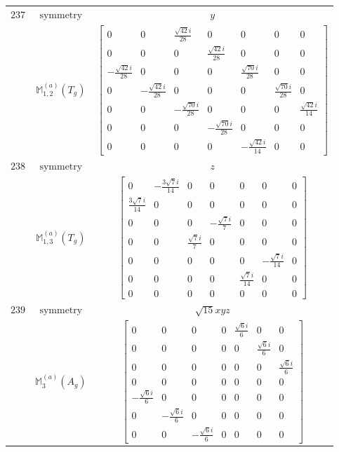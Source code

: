 \documentclass[fleqn,8pt,landscape]{jsarticle}
\begin{document}
\begin{longtable}{ccc}
$ 237 $ & $ \text{symmetry} $ & $ y $ \\
$  $ & $ \mathbb{M}_{1,2}^{(a)}(T_{g}) $ & $ \begin{bmatrix} 0 & 0 & \frac{\sqrt{42} i}{28} & 0 & 0 & 0 & 0 \\ 0 & 0 & 0 & \frac{\sqrt{42} i}{28} & 0 & 0 & 0 \\ - \frac{\sqrt{42} i}{28} & 0 & 0 & 0 & \frac{\sqrt{70} i}{28} & 0 & 0 \\ 0 & - \frac{\sqrt{42} i}{28} & 0 & 0 & 0 & \frac{\sqrt{70} i}{28} & 0 \\ 0 & 0 & - \frac{\sqrt{70} i}{28} & 0 & 0 & 0 & \frac{\sqrt{42} i}{14} \\ 0 & 0 & 0 & - \frac{\sqrt{70} i}{28} & 0 & 0 & 0 \\ 0 & 0 & 0 & 0 & - \frac{\sqrt{42} i}{14} & 0 & 0 \end{bmatrix} $ \\ \hline
$ 238 $ & $ \text{symmetry} $ & $ z $ \\
$  $ & $ \mathbb{M}_{1,3}^{(a)}(T_{g}) $ & $ \begin{bmatrix} 0 & - \frac{3 \sqrt{7} i}{14} & 0 & 0 & 0 & 0 & 0 \\ \frac{3 \sqrt{7} i}{14} & 0 & 0 & 0 & 0 & 0 & 0 \\ 0 & 0 & 0 & - \frac{\sqrt{7} i}{7} & 0 & 0 & 0 \\ 0 & 0 & \frac{\sqrt{7} i}{7} & 0 & 0 & 0 & 0 \\ 0 & 0 & 0 & 0 & 0 & - \frac{\sqrt{7} i}{14} & 0 \\ 0 & 0 & 0 & 0 & \frac{\sqrt{7} i}{14} & 0 & 0 \\ 0 & 0 & 0 & 0 & 0 & 0 & 0 \end{bmatrix} $ \\ \hline
$ 239 $ & $ \text{symmetry} $ & $ \sqrt{15} x y z $ \\
$  $ & $ \mathbb{M}_{3}^{(a)}(A_{g}) $ & $ \begin{bmatrix} 0 & 0 & 0 & 0 & \frac{\sqrt{6} i}{6} & 0 & 0 \\ 0 & 0 & 0 & 0 & 0 & \frac{\sqrt{6} i}{6} & 0 \\ 0 & 0 & 0 & 0 & 0 & 0 & \frac{\sqrt{6} i}{6} \\ 0 & 0 & 0 & 0 & 0 & 0 & 0 \\ - \frac{\sqrt{6} i}{6} & 0 & 0 & 0 & 0 & 0 & 0 \\ 0 & - \frac{\sqrt{6} i}{6} & 0 & 0 & 0 & 0 & 0 \\ 0 & 0 & - \frac{\sqrt{6} i}{6} & 0 & 0 & 0 & 0 \end{bmatrix} $ \\ \hline

\end{longtable}
\end{document}
